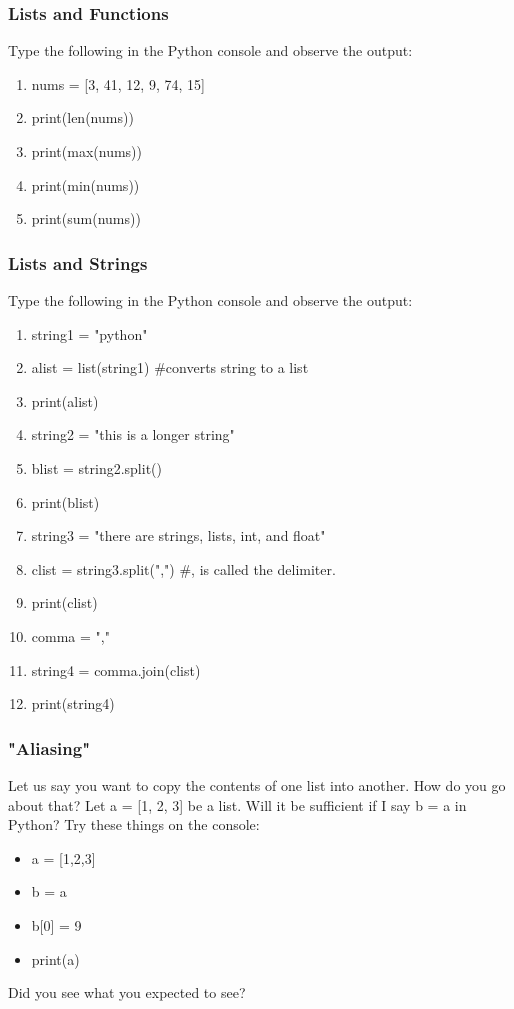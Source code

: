 \documentclass{beamer}
\begin{document}
\begin{frame}
\frametitle{Lists and Functions}
Type the following in the Python console and observe the output:
\begin{enumerate}
\item nums = [3, 41, 12, 9, 74, 15]
\item print(len(nums))
\item print(max(nums))
\item print(min(nums))
\item print(sum(nums))
\end{enumerate}
\end{frame}

\begin{frame}
\frametitle{Lists and Strings}
Type the following in the Python console and observe the output:
\begin{enumerate}
\item string1 = "python"
\item alist = list(string1) \#converts string to a list
\item print(alist)
\item string2 = "this is a longer string"
\item blist = string2.split()
\item print(blist)
\item string3 = "there are strings, lists, int, and float"
\item clist = string3.split(",") \#, is called the delimiter.
\item print(clist)
\item comma = ","
\item string4 = comma.join(clist)
\item print(string4)
\end{enumerate}
\end{frame}

\begin{frame}
\frametitle{"Aliasing"}
Let us say you want to copy the contents of one list into another. How do you go about that?
\medskip \pause
Let a = [1, 2, 3] be a list. Will it be sufficient if I say b = a in Python? \medskip \pause
Try these things on the console:
\begin{itemize}
\item a = [1,2,3]
\item b = a
\item b[0] = 9
\item print(a)
\end{itemize}
Did you see what you expected to see?
\end{frame}
\end{document}
